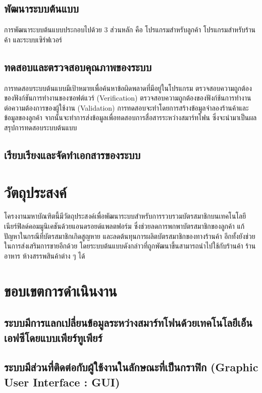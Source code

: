 \documentclass[a4paper]{article}
\begin{document}
\subsection{พัฒนาระบบต้นแบบ}
การพัฒนาระบบต้นแบบประกอบไปด้วย 3 ส่วนหลัก คือ โปรแกรมสำหรับลูกค้า โปรแกรมสำหรับร้านค้า และระบบเซิร์ฟเวอร์

\subsection{ทดสอบและตรวจสอบคุณภาพของระบบ}
การทดสอบระบบต้นแบบมีเป้าหมายเพื่อค้นหาข้อผิดพลาดที่มีอยู่ในโปรแกรม ตรวจสอบความถูกต้องของฟังก์ชันการทำงานของซอฟต์แวร์ (Verification) ตรวจสอบความถูกต้องของฟังก์ช้นการทํางานต่อความต้องการของผู้ใช้งาน (Validation) การทดสอบจะทำโดยการสร้างข้อมูลจำลองร้านค้าและข้อมูลของลูกค้า จากนั้นจะทำการส่งข้อมูลเพื่อทดสอบการสื่อสารระหว่างสมาร์ทโฟน ซึ่งจะนํามาเป็นผลสรุปการทดสอบระบบต้นแบบ

\subsection{เรียบเรียงและจัดทําเอกสารของระบบ}


\section{วัตถุประสงค์}
โครงงานมหาบัณฑิตนี้มีวัตถุประสงค์เพื่อพัฒนาระบบสำหรับการรวบรวมบัตรสมาชิกบนเทคโนโลยีเนียร์ฟิลด์คอมมูนิเคชันด้วยแอนดรอยด์แพลตฟอร์ม ซึ่งช่วยลดการพกพาบัตรสมาชิกของลูกค้า แก้ปัญหาในกรณีที่บัตรสมาชิกเกิดสูญหาย และลดต้นทุนการผลิตบัตรสมาชิกของทางร้านค้า อีกทั้งยังช่วยในการส่งเสริมการขายอีกด้วย โดยระบบต้นแบบดังกล่าวที่ถูกพัฒนาขึ้นสามารถนำไปใช้กับร้านค้า ร้านอาหาร ห้างสรรพสินค้าต่าง ๆ ได้

\section{ขอบเขตการดำเนินงาน}
\subsection{ระบบมีการแลกเปลี่ยนข้อมูลระหว่างสมาร์ทโฟนด้วยเทคโนโลยีเอ็นเอฟซีโดยแบบเพียร์ทูเพียร์}
\subsection{ระบบมีส่วนที่ติดต่อกับผู้ใช้งานในลักษณะที่เป็นกราฟิก (Graphic User Interface : GUI)}
\end{document}

